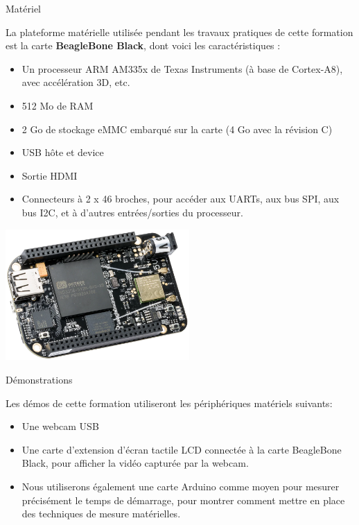 \documentclass[a4paper,12pt,obeyspaces,spaces,hyphens]{article}
\begin{document}
\feshowtitle

\certificate{}
\disabilities{}

\feagendatwocolumn
{Matériel}
{
  La plateforme matérielle utilisée pendant les travaux pratiques de
  cette formation est la carte {\bf BeagleBone Black}, dont voici les
  caractéristiques :

  \begin{itemize}
  \item Un processeur ARM AM335x de Texas Instruments (à base de
    Cortex-A8), avec accélération 3D, etc.
  \item 512 Mo de RAM
  \item 2 Go de stockage eMMC embarqué sur la carte
	\newline(4 Go avec la révision C)
  \item USB hôte et device
  \item Sortie HDMI
  \item Connecteurs à 2 x 46 broches, pour accéder aux UARTs, aux
        bus SPI, aux bus I2C, et à d'autres entrées/sorties du
        processeur.
  \end{itemize}
}
{}
{
  \begin{center}
    \includegraphics[height=5cm]{../slides/beagleboneblack-board/beagleboneblack.png}
  \end{center}
}

\feagendaonecolumn
{Démonstrations}
{
  Les démos de cette formation utiliseront les périphériques matériels suivants:

  \begin{itemize}
  \item Une webcam USB
  \item Une carte d'extension d'écran tactile LCD connectée à la carte
    BeagleBone Black, pour afficher la vidéo capturée par la webcam.
  \item Nous utiliserons également une carte Arduino comme moyen pour mesurer
    précisément le temps de démarrage, pour montrer comment mettre en place
    des techniques de mesure matérielles.
  \end{itemize}
}
\end{document}

